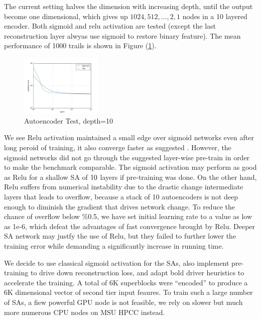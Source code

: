 \documentclass[acmtog, authorversion]{acmart}
\begin{document}
The current setting halves the dimension with increasing depth, until the output become one dimensional, which gives up $1024, 512, \dots, 2, 1$ nodes in a 10 layered encoder. Both sigmoid and relu activation are tested (except the last reconstruction layer alwyas use sigmoid to restore binary feature). The mean performance of 1000 trails is shown in Figure (\ref{fig:ae0}).
\begin{figure}[h]
  \centering
  \includegraphics[width=0.35\textwidth]{img/00}
  \caption{Autoencoder Test, depth=10}
  \label{fig:ae0}
\end{figure}
We see Relu activation maintained a small edge over sigmoid networks even after long peroid of training, it also converge faster as suggested \cite{DL:Relu1}. However, the sigmoid networks did not go through the suggested layer-wise pre-train \cite{DL:Intro1} in order to make the benchmark comparable. The sigmoid activation may perform as good as Relu for a shallow SA of $10 \time 2$ layers if pre-training was done. On the other hand, Relu suffers from numerical instability due to the drastic change intermediate layers that leads to overflow, because a stack of 10 autoencoders is not deep enough to diminish the gradient that drives network change. To reduce the chance of overflow below \%0.5, we have set initial learning rate to a value as low as 1e-6, which defeat the advantages of fast convergence brought by Relu. Deeper SA network may justfy the use of Relu, but they failed to further lower the training error while demanding a significantly increase in running time. 

We decide to use classical sigmoid activation for the SAs, also implement pre-training to drive down reconstruction loss, and adapt bold driver heuristics to accelerate the training. A total of 6K superblocks were ``encoded'' to produce a 6K dimensional vector of second tier input feaures. To train such a large number of SAs, a fiew powerful GPU node is not feasible, we rely on slower but much more numerous CPU nodes on MSU HPCC instead.




\end{document}

